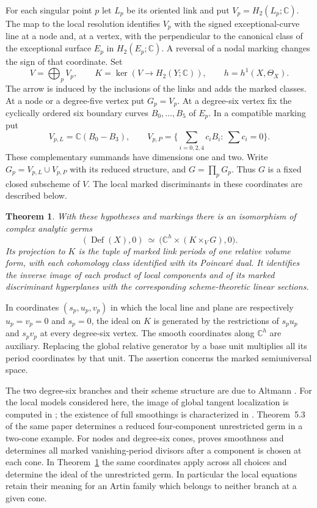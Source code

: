 \documentclass[11pt]{amsart}
\newtheorem{theorem}{Theorem}[section]
\theoremstyle{definition}
\theoremstyle{remark}
\newcommand{\C}{\mathbb C}
\DeclareMathOperator{\Def}{Def}
\begin{document}
For each singular point $p$ let $L_p$ be its oriented link and put
$V_p=H_2(L_p;\C)$. The map to the local resolution identifies $V_p$
with the signed exceptional-curve line at a node and, at a vertex, with
the perpendicular to the canonical class of the exceptional surface $E_p$
in $H_2(E_p;\C)$. A reversal of a nodal marking changes the sign of that
coordinate. Set
\begin{equation}\label{eq:kernel}
 V=\bigoplus_p V_p,\qquad
 K=\ker\left(V\longrightarrow H_2(Y;\C)\right),\qquad
 h=h^1(X,\Theta_X).
\end{equation}
The arrow is induced by the inclusions of the links and adds the marked
classes. At a node or a degree-five vertex put $G_p=V_p$. At a degree-six
vertex fix the cyclically ordered six boundary curves $B_0,\ldots,B_5$
of $E_p$. In a compatible marking put
\[
 V_{p,L}=\C(B_0-B_3),\qquad
 V_{p,P}=\Big\{\sum_{i=0,2,4}c_i B_i:\ \sum c_i=0\Big\}.
\]
These complementary summands have dimensions one and two. Write
$G_p=V_{p,L}\cup V_{p,P}$ with its reduced structure, and $G=\prod_pG_p$.
Thus $G$ is a fixed closed subscheme of $V$. The local marked
discriminants in these coordinates are described below.

\begin{theorem}\label{thm:main}
With these hypotheses and markings there is an isomorphism of complex
analytic germs
\[
 (\Def(X),0)\ \simeq\
 \big(\C^h\times (K\times_V G),0\big).
\]
Its projection to $K$ is the tuple of marked link periods of one relative
volume form, with each cohomology class identified with its Poincar\'e
dual. It identifies the inverse image of each product of local components
and of its marked discriminant hyperplanes with the corresponding
scheme-theoretic linear sections.
\end{theorem}

In coordinates $(s_p,u_p,v_p)$ in which the local line and plane are
respectively $u_p=v_p=0$ and $s_p=0$, the ideal on $K$ is generated by
the restrictions of $s_pu_p$ and $s_pv_p$ at every degree-six vertex.
The smooth coordinates along $\C^h$ are auxiliary. Replacing the global
relative generator by a base unit multiplies all its period coordinates
by that unit. The assertion concerns the marked semiuniversal space.

The two degree-six branches and their scheme structure are due to
Altmann \cite{Alt}. For the local models considered here, the image of
global tangent localization is computed in \cite[Theorem~2.5]{W5};
the existence of full smoothings is characterized in
\cite[Theorem~4.7]{W5}. Theorem~5.3 of the same paper determines a
reduced four-component unrestricted germ in a two-cone example.
For nodes and degree-six cones,
\cite[Theorems~2.2 and~3.1]{Partial} proves smoothness and determines
all marked vanishing-period divisors after a component is chosen at
each cone. In Theorem~\ref{thm:main} the same coordinates apply across
all choices and determine the ideal of the unrestricted germ. In
particular the local equations retain their meaning for an Artin family
which belongs to neither branch at a given cone.
\end{document}
